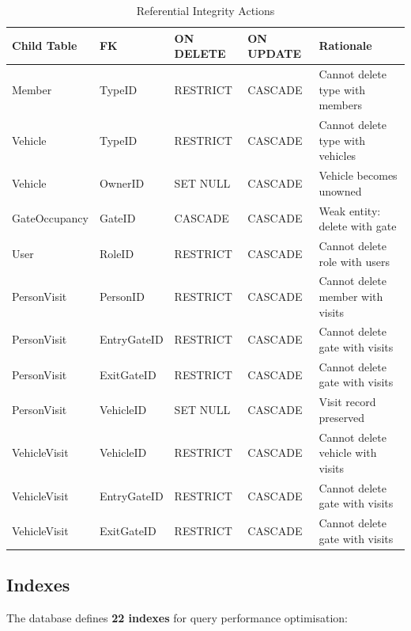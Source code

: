 \documentclass[a4paper, 12pt]{article}
\begin{document}
\begin{table}[H]
\centering
\caption{Referential Integrity Actions}
\label{tab:ref-integrity}
\small
\begin{tabularx}{\textwidth}{l l l l X}
\toprule
\textbf{Child Table} & \textbf{FK} & \textbf{ON DELETE} & \textbf{ON UPDATE} & \textbf{Rationale} \\
\midrule
Member & TypeID & RESTRICT & CASCADE & Cannot delete type with members \\
Vehicle & TypeID & RESTRICT & CASCADE & Cannot delete type with vehicles \\
Vehicle & OwnerID & SET NULL & CASCADE & Vehicle becomes unowned \\
GateOccupancy & GateID & CASCADE & CASCADE & Weak entity: delete with gate \\
User & RoleID & RESTRICT & CASCADE & Cannot delete role with users \\
PersonVisit & PersonID & RESTRICT & CASCADE & Cannot delete member with visits \\
PersonVisit & EntryGateID & RESTRICT & CASCADE & Cannot delete gate with visits \\
PersonVisit & ExitGateID & RESTRICT & CASCADE & Cannot delete gate with visits \\
PersonVisit & VehicleID & SET NULL & CASCADE & Visit record preserved \\
VehicleVisit & VehicleID & RESTRICT & CASCADE & Cannot delete vehicle with visits \\
VehicleVisit & EntryGateID & RESTRICT & CASCADE & Cannot delete gate with visits \\
VehicleVisit & ExitGateID & RESTRICT & CASCADE & Cannot delete gate with visits \\
\bottomrule
\end{tabularx}
\end{table}

\subsection{Indexes}

The database defines \textbf{22 indexes} for query performance optimisation:
\end{document}

